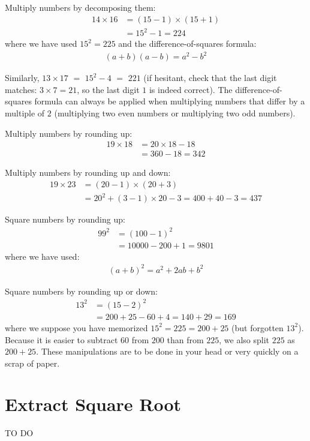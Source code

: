 \documentclass[12pt]{article}
\begin{document}
Multiply numbers by decomposing them:
\begin{align*}
14 \times 16
 & = (15-1) \times (15+1) \\
 & = 15^2 -1 = 224
\end{align*}
where we have used $15^2=225$ and the difference-of-squares formula:
\begin{align*}
(a+b) (a-b) = a^2 - b^2
\end{align*}

Similarly, $13 \times 17$ $=$ $15^2 -4$ $=$ $221$ (if hesitant, check that the last digit matches: $3\times7=21$, so the last digit $1$ is indeed correct).
The difference-of-squares formula can always be applied when multiplying numbers that differ by a multiple of $2$ (multiplying two even numbers or multiplying two odd numbers). 

Multiply numbers by rounding up:
\begin{align*}
19 \times 18
 & = 20 \times 18 - 18\\
 & = 360 - 18 = 342
\end{align*}

Multiply numbers by rounding up and down:
\begin{align*}
19 \times 23
 & = (20-1) \times (20+3) \\
 & = 20^2 + (3-1) \times 20 -3 = 400 + 40 - 3 = 437
\end{align*}

Square numbers by rounding up:
\begin{align*}
99^2 
 & = (100-1)^2 \\
 & = 10000 - 200 + 1 = 9801
\end{align*}
where we have used:
\begin{align*}
(a + b)^2 = a^2 + 2ab + b^2
\end{align*}

Square numbers by rounding up or down:
\begin{align*}
13^2 
 & = (15-2)^2 \\
 & = 200 + 25 - 60 + 4 = 140 + 29 = 169
\end{align*}
where we suppose you have memorized $15^2=225=200+25$ (but forgotten $13^2$). Because it is easier to subtract $60$ from $200$ than from $225$, we also split $225$ as $200+25$. These manipulations are to be done in your head or very quickly on a scrap of paper. 


\section*{Extract Square Root}
TO DO
\end{document}
